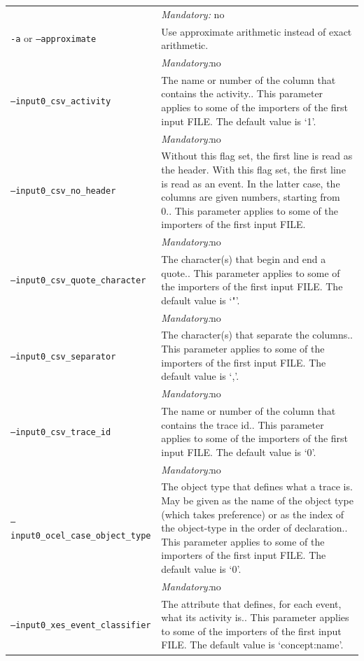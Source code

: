 {\begin{tabularx}{\linewidth}{lX}
&\textit{Mandatory:} \quad no\\
\texttt{-a} or \texttt{--approximate} & Use approximate arithmetic instead of exact arithmetic.\\
&\textit{Mandatory:}\quad no\\
\texttt{--input0\_csv\_activity} & The name or number of the column that contains the activity.. This parameter applies to some of the importers of the first input FILE. The default value is `1'.\\
&\textit{Mandatory:}\quad no\\
\texttt{--input0\_csv\_no\_header} & Without this flag set, the first line is read as the header. 
    With this flag set, the first line is read as an event. In the latter case, the columns are given numbers, starting from 0.. This parameter applies to some of the importers of the first input FILE. \\
&\textit{Mandatory:}\quad no\\
\texttt{--input0\_csv\_quote\_character} & The character(s) that begin and end a quote.. This parameter applies to some of the importers of the first input FILE. The default value is `"'.\\
&\textit{Mandatory:}\quad no\\
\texttt{--input0\_csv\_separator} & The character(s) that separate the columns.. This parameter applies to some of the importers of the first input FILE. The default value is `,'.\\
&\textit{Mandatory:}\quad no\\
\texttt{--input0\_csv\_trace\_id} & The name or number of the column that contains the trace id.. This parameter applies to some of the importers of the first input FILE. The default value is `0'.\\
&\textit{Mandatory:}\quad no\\
\texttt{--input0\_ocel\_case\_object\_type} & The object type that defines what a trace is. May be given as the name of the object type (which takes preference) or as the index of the object-type in the order of declaration.. This parameter applies to some of the importers of the first input FILE. The default value is `0'.\\
&\textit{Mandatory:}\quad no\\
\texttt{--input0\_xes\_event\_classifier} & The attribute that defines, for each event, what its activity is.. This parameter applies to some of the importers of the first input FILE. The default value is `concept:name'.\\

\end{tabularx}}
